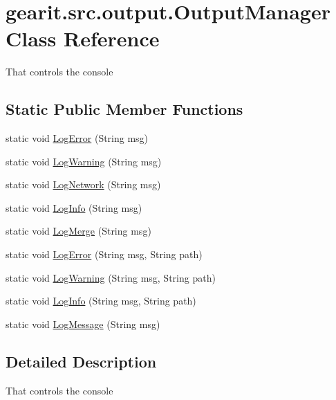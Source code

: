 \hypertarget{classgearit_1_1src_1_1output_1_1_output_manager}{\section{gearit.\+src.\+output.\+Output\+Manager Class Reference}
\label{classgearit_1_1src_1_1output_1_1_output_manager}
}


That controls the console  


\subsection*{Static Public Member Functions}
\begin{DoxyCompactItemize}
\item 
static void \hyperlink{classgearit_1_1src_1_1output_1_1_output_manager_acaae4a30555bf4b8d36e772cc54f5bcd}{Log\+Error} (String msg)
\item 
static void \hyperlink{classgearit_1_1src_1_1output_1_1_output_manager_a40e0dc1925fae669404e6e531e73d7c2}{Log\+Warning} (String msg)
\item 
static void \hyperlink{classgearit_1_1src_1_1output_1_1_output_manager_a810c102fd25b7030d72a2890f0b2dd93}{Log\+Network} (String msg)
\item 
static void \hyperlink{classgearit_1_1src_1_1output_1_1_output_manager_a4636079e6a57dffaa54b96c746fd7054}{Log\+Info} (String msg)
\item 
static void \hyperlink{classgearit_1_1src_1_1output_1_1_output_manager_a0294b9d2ea9b9c2ff2d672536b801e29}{Log\+Merge} (String msg)
\item 
static void \hyperlink{classgearit_1_1src_1_1output_1_1_output_manager_a5e827d32b10cca4a1b497b614a5e21dd}{Log\+Error} (String msg, String path)
\item 
static void \hyperlink{classgearit_1_1src_1_1output_1_1_output_manager_a2a1d228658e27819e7147c2cdda82669}{Log\+Warning} (String msg, String path)
\item 
static void \hyperlink{classgearit_1_1src_1_1output_1_1_output_manager_a9479bcc3dbbdb9d67f3874b62acd2958}{Log\+Info} (String msg, String path)
\item 
static void \hyperlink{classgearit_1_1src_1_1output_1_1_output_manager_ad9a6879b84194c3ea438e84f65d2df83}{Log\+Message} (String msg)
\end{DoxyCompactItemize}


\subsection{Detailed Description}
That controls the console 



